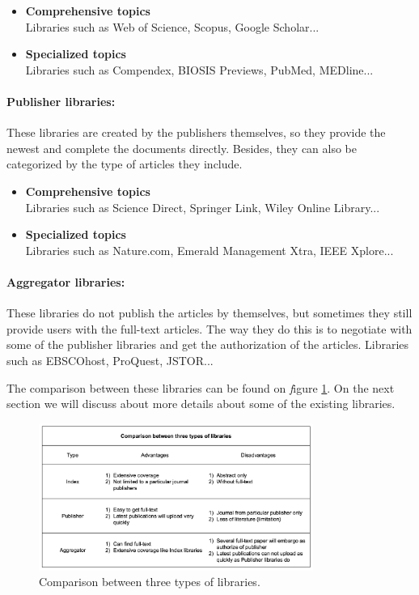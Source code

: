 	\begin{itemize}		
		\item\textbf{Comprehensive topics}\\Libraries such as Web of Science, Scopus, Google Scholar...
		\item\textbf{Specialized topics}\\Libraries such as Compendex, BIOSIS Previews, PubMed, MEDline...		
	\end{itemize}
	
\paragraph{Publisher libraries:}
	These libraries are created by the publishers themselves, so they provide the newest and complete the documents directly.
	Besides, they can also be categorized by the type of articles they include.
	
	\begin{itemize}		
		\item\textbf{Comprehensive topics}\\Libraries such as Science Direct, Springer Link, Wiley Online Library...
		\item\textbf{Specialized topics}\\Libraries such as Nature.com, Emerald Management Xtra, IEEE Xplore...	
	\end{itemize}
	
\paragraph{Aggregator libraries:}
	These libraries do not publish the articles by themselves, but sometimes they still provide users with the full-text articles.
	The way they do this is to negotiate with some of the publisher libraries and get the authorization of the articles.
	Libraries such as EBSCOhost, ProQuest, JSTOR...

	The comparison between these libraries can be found on \textit figure \ref{WBC1}.
	On the next section we will discuss about more details about some of the existing libraries.

\begin{figure}[htb]
	\begin{center}
		\includegraphics[width=0.8\textwidth]{Wolverine_Background_Chart_1}
	\end{center}
	\caption{Comparison between three types of libraries.\label{WBC1}}
\end{figure}
\newpage

